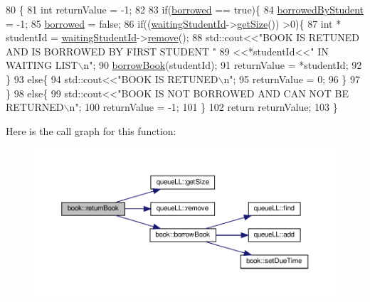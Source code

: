 \begin{DoxyCode}
80                      \{
81     \textcolor{keywordtype}{int} returnValue = -1;
82 
83     \textcolor{keywordflow}{if}(\hyperlink{classbook_ab745520ed537e69bde6f2e3d7a103276}{borrowed} == \textcolor{keyword}{true})\{
84         \hyperlink{classbook_afa5350900be6a34d8301a57d6db54df5}{borrowedByStudent} = -1;
85         \hyperlink{classbook_ab745520ed537e69bde6f2e3d7a103276}{borrowed} = \textcolor{keyword}{false};
86         \textcolor{keywordflow}{if}((\hyperlink{classbook_a40ce04fcfbf99ffdbe7a4e1463588ee5}{waitingStudentId}->\hyperlink{classqueue_l_l_a8969feebcb563f0b489bc112422b9563}{getSize}()) >0)\{
87             \textcolor{keywordtype}{int} * studentId = \hyperlink{classbook_a40ce04fcfbf99ffdbe7a4e1463588ee5}{waitingStudentId}->\hyperlink{classqueue_l_l_a4204a9db973b69be5824ca2495130b40}{remove}();
88             std::cout<<\textcolor{stringliteral}{"BOOK IS RETUNED AND IS BORROWED BY FIRST STUDENT "}
89                     <<*studentId<<\textcolor{stringliteral}{" IN WAITING LIST\(\backslash\)n"};
90             \hyperlink{classbook_a68bc47d79edd93594d50f720be2653f6}{borrowBook}(studentId);
91             returnValue = *studentId;
92         \}
93         \textcolor{keywordflow}{else}\{
94             std::cout<<\textcolor{stringliteral}{"BOOK IS RETUNED\(\backslash\)n"};
95             returnValue = 0;
96         \}
97     \}
98     \textcolor{keywordflow}{else}\{
99         std::cout<<\textcolor{stringliteral}{"BOOK IS NOT BORROWED AND CAN NOT BE RETURNED\(\backslash\)n"};
100         returnValue = -1;
101     \}
102     \textcolor{keywordflow}{return}  returnValue;
103 \}
\end{DoxyCode}
Here is the call graph for this function\+:
\nopagebreak
\begin{figure}[H]
\begin{center}
\leavevmode
\includegraphics[width=350pt]{classbook_af11d02d9964b788986dc8e26d1cdf373_cgraph}
\end{center}
\end{figure}

